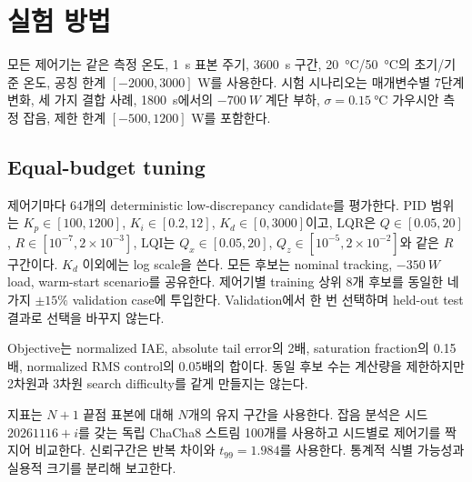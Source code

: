 \section{실험 방법}\label{sec:methods}
모든 제어기는 같은 측정 온도, \SI{1}{s} 표본 주기, \SI{3600}{s} 구간, \SI{20}{\celsius}/\SI{50}{\celsius}의 초기/기준 온도, 공칭 한계 $[-2000,3000]$ W를 사용한다. 시험 시나리오는 매개변수별 7단계 변화, 세 가지 결합 사례, \SI{1800}{s}에서의 $-\SI{700}{W}$ 계단 부하, $\sigma=\SI{0.15}{\celsius}$ 가우시안 측정 잡음, 제한 한계 $[-500,1200]$ W를 포함한다.

\subsection{Equal-budget tuning}
제어기마다 64개의 deterministic low-discrepancy candidate를 평가한다. PID 범위는 $K_p\in[100,1200]$, $K_i\in[0.2,12]$, $K_d\in[0,3000]$이고, LQR은 $Q\in[0.05,20]$, $R\in[10^{-7},2\times10^{-3}]$, LQI는 $Q_x\in[0.05,20]$, $Q_z\in[10^{-5},2\times10^{-2}]$와 같은 $R$ 구간이다. $K_d$ 이외에는 log scale을 쓴다. 모든 후보는 nominal tracking, $-\SI{350}{W}$ load, warm-start scenario를 공유한다. 제어기별 training 상위 8개 후보를 동일한 네 가지 $\pm15\%$ validation case에 투입한다. Validation에서 한 번 선택하며 held-out test 결과로 선택을 바꾸지 않는다.

Objective는 normalized IAE, absolute tail error의 2배, saturation fraction의 0.15배, normalized RMS control의 0.05배의 합이다. 동일 후보 수는 계산량을 제한하지만 2차원과 3차원 search difficulty를 같게 만들지는 않는다.

지표는 $N+1$ 끝점 표본에 대해 $N$개의 유지 구간을 사용한다. 잡음 분석은 시드 $20261116+i$를 갖는 독립 ChaCha8 스트림 100개를 사용하고 시드별로 제어기를 짝지어 비교한다. 신뢰구간은 반복 차이와 $t_{99}=1.984$를 사용한다. 통계적 식별 가능성과 실용적 크기를 분리해 보고한다.
